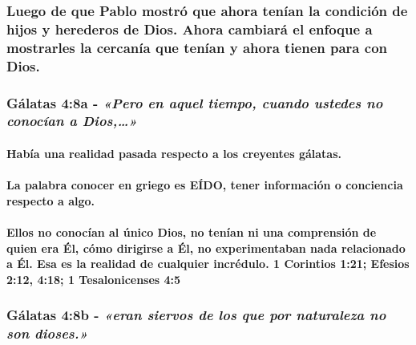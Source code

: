 \documentclass[11a pt,twoside]{article}
\newcommand{\scripture}[1]{%
  {\fontsize{12pt}{16pt}\selectfont\ScriptureFont\itshape #1}%
}
\let\oldsubsubsection\subsubsection
\renewcommand{\subsubsection}{\needspace{4\baselineskip}\oldsubsubsection}
\let\oldparagraph\paragraph
\renewcommand{\paragraph}{\needspace{3\baselineskip}\oldparagraph}
\begin{document}
\subsubsection{Luego de que Pablo mostró que ahora tenían la condición
de hijos y herederos de Dios. Ahora cambiará el enfoque a mostrarles la
cercanía que tenían y ahora tienen para con
Dios.}\label{luego-de-que-pablo-mostruxf3-que-ahora-tenuxedan-la-condiciuxf3n-de-hijos-y-herederos-de-dios.-ahora-cambiaruxe1-el-enfoque-a-mostrarles-la-cercanuxeda-que-tenuxedan-y-ahora-tienen-para-con-dios.}

\subsubsection{\texorpdfstring{Gálatas 4:8a -
\scripture{«Pero en aquel tiempo, cuando ustedes no conocían a Dios,…»}}{Gálatas 4:8a - }}\label{guxe1latas-48a---pero-en-aquel-tiempo-cuando-ustedes-no-conocuxedan-a-dios}

\paragraph{Había una realidad pasada respecto a los creyentes
gálatas.}\label{habuxeda-una-realidad-pasada-respecto-a-los-creyentes-guxe1latas.}

\paragraph{La palabra conocer en griego es EÍDO, tener información o
conciencia respecto a
algo.}\label{la-palabra-conocer-en-griego-es-euxeddo-tener-informaciuxf3n-o-conciencia-respecto-a-algo.}

\paragraph{Ellos no conocían al único Dios, no tenían ni una comprensión
de quien era Él, cómo dirigirse a Él, no experimentaban nada relacionado
a Él. Esa es la realidad de cualquier incrédulo. 1 Corintios 1:21;
Efesios 2:12, 4:18; 1 Tesalonicenses
4:5}\label{ellos-no-conocuxedan-al-uxfanico-dios-no-tenuxedan-ni-una-comprensiuxf3n-de-quien-era-uxe9l-cuxf3mo-dirigirse-a-uxe9l-no-experimentaban-nada-relacionado-a-uxe9l.-esa-es-la-realidad-de-cualquier-incruxe9dulo.-1-corintios-121-efesios-212-418-1-tesalonicenses-45}

\subsubsection{\texorpdfstring{Gálatas 4:8b -
\scripture{«eran siervos de los que por naturaleza no son dioses.»}}{Gálatas 4:8b - }}\label{guxe1latas-48b---eran-siervos-de-los-que-por-naturaleza-no-son-dioses.}
\end{document}
